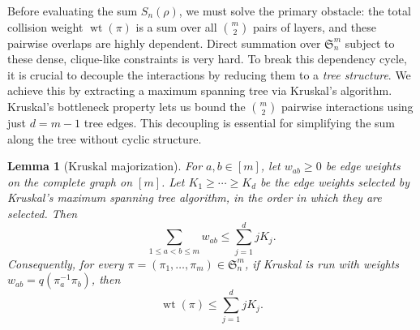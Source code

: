 \documentclass[11pt,reqno]{amsart}
\newtheorem{lemma}[theorem]{Lemma}
\theoremstyle{definition}
\theoremstyle{remark}
\renewcommand\le{\leqslant}
\renewcommand\ge{\geqslant}
\newcommand{\wt}{\operatorname{wt}}
\begin{document}
Before evaluating the sum $S_n(\rho)$, we must solve the primary obstacle: the total collision weight $\wt(\pi)$ is a sum over all $\binom{m}{2}$ pairs of layers, and these pairwise overlaps are highly dependent. Direct summation over $\mathfrak{S}_n^m$ subject to these dense, clique-like constraints is very hard. To break this dependency cycle, it is crucial to decouple the interactions by reducing them to a \emph{tree structure}. We achieve this by extracting a maximum spanning tree via Kruskal's algorithm. Kruskal's bottleneck property lets us bound the $\binom{m}{2}$ pairwise interactions using just $d = m-1$ tree edges. This decoupling is essential for simplifying the sum along the tree without cyclic structure.



\begin{lemma}[Kruskal majorization]\label{lem:kruskal-majorization-detailed}
For $a,b\in[m]$, let $w_{ab}\ge0$ be edge weights on the complete graph on $[m]$. Let $K_1\ge\cdots\ge K_d$ be the edge weights selected by Kruskal's maximum spanning tree algorithm, in the order in which they are selected. Then
\begin{equation}\label{eq:kruskal-majorization-detailed}
        \sum_{1\le a<b\le m}w_{ab}\le \sum_{j=1}^d jK_j .
\end{equation}
Consequently, for every $\pi=(\pi_1,\ldots,\pi_m)\in\mathfrak S_n^m$, if Kruskal is run with weights $w_{ab}=q(\pi_a^{-1}\pi_b)$, then
\begin{equation}\label{eq:refined-tree-majorization}
        \wt(\pi)\le \sum_{j=1}^d jK_j .
\end{equation}
\end{lemma}
\end{document}
